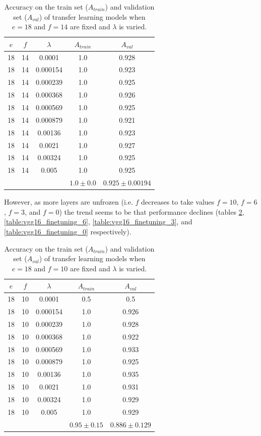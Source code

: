\begin{table}[ht]
\centering
\begin{tabular}{ |c|c|c|c|c| }
\hline
$e$ & $f$ & $\lambda$ & $A_{train}$ & $A_{val}$ \\
\hline
18 & 14 & 0.0001 & 1.0 & 0.928 \\
18 & 14 & 0.000154 & 1.0 & 0.923 \\
18 & 14 & 0.000239 & 1.0 & 0.925 \\
18 & 14 & 0.000368 & 1.0 & 0.926 \\
18 & 14 & 0.000569 & 1.0 & 0.925 \\
18 & 14 & 0.000879 & 1.0 & 0.921 \\
18 & 14 & 0.00136 & 1.0 & 0.923 \\
18 & 14 & 0.0021 & 1.0 & 0.927 \\
18 & 14 & 0.00324 & 1.0 & 0.925 \\
18 & 14 & 0.005 & 1.0 & 0.925 \\
\hline
 & & & $1.0\pm0.0$ & $0.925\pm0.00194$ \\
\hline
\end{tabular}
\caption{Accuracy on the train set ($A_{train}$) and validation set ($A_{val}$) of transfer learning models when $e = 18$ and $f = 14$ are fixed and $\lambda$ is varied.}
\label{table:vgg16_finetuning_14}
\end{table}

However, as more layers are unfrozen (i.e. $f$ decreases to take values $f = 10$, $f = 6$, $f = 3$, and $f = 0$) the trend seems to be that performance declines (tables \ref{table:vgg16_finetuning_10}, \ref{table:vgg16_finetuning_6}, \ref{table:vgg16_finetuning_3}, and \ref{table:vgg16_finetuning_0} respectively).

\begin{table}[ht]
\centering
\begin{tabular}{ |c|c|c|c|c| }
\hline
$e$ & $f$ & $\lambda$ & $A_{train}$ & $A_{val}$ \\
\hline
18 & 10 & 0.0001 & 0.5 & 0.5 \\
18 & 10 & 0.000154 & 1.0 & 0.926 \\
18 & 10 & 0.000239 & 1.0 & 0.928 \\
18 & 10 & 0.000368 & 1.0 & 0.922 \\
18 & 10 & 0.000569 & 1.0 & 0.933 \\
18 & 10 & 0.000879 & 1.0 & 0.925 \\
18 & 10 & 0.00136 & 1.0 & 0.935 \\
18 & 10 & 0.0021 & 1.0 & 0.931 \\
18 & 10 & 0.00324 & 1.0 & 0.929 \\
18 & 10 & 0.005 & 1.0 & 0.929 \\
\hline
 & & & $0.95\pm0.15$ & $0.886\pm0.129$ \\
\hline
\end{tabular}
\caption{Accuracy on the train set ($A_{train}$) and validation set ($A_{val}$) of transfer learning models when $e = 18$ and $f = 10$ are fixed and $\lambda$ is varied.}
\label{table:vgg16_finetuning_10}
\end{table}

